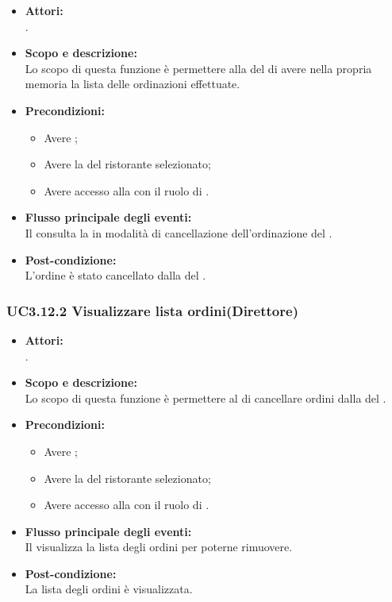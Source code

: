 \begin{itemize}
	\item \textbf{Attori:}
	\\.
	\item \textbf{Scopo e descrizione:} 
	\\Lo scopo di questa funzione è permettere alla  del  di avere nella propria memoria la lista delle ordinazioni effettuate.
	\item \textbf{Precondizioni:}
	\begin{itemize}
		\item Avere ;
		\item Avere la  del ristorante selezionato;
		\item Avere accesso alla  con il ruolo di .
	\end{itemize}
	\item \textbf{Flusso principale degli eventi:}
	\\Il {} consulta la  in modalità di cancellazione dell'ordinazione del .
	\item \textbf{Post-condizione:}
	\\L'ordine è stato cancellato dalla  del .
\end{itemize}

\subsubsection{UC3.12.2 Visualizzare lista ordini(Direttore)} \label{UC3.12.2}

\begin{itemize}
	\item \textbf{Attori:}
	\\.
	\item \textbf{Scopo e descrizione:} 
	\\Lo scopo di questa funzione è permettere al  di cancellare ordini dalla  del .
	\item \textbf{Precondizioni:}
	\begin{itemize}
		\item Avere ;
		\item Avere la  del ristorante selezionato;
		\item Avere accesso alla  con il ruolo di .
	\end{itemize}
	\item \textbf{Flusso principale degli eventi:}
	\\Il {} visualizza la lista degli ordini per poterne rimuovere.
	\item \textbf{Post-condizione:}
	\\La lista degli ordini è visualizzata.
\end{itemize}

